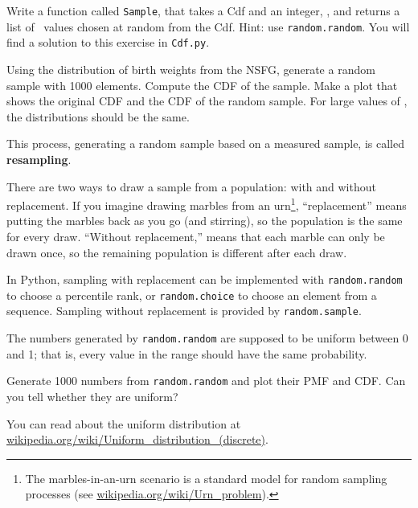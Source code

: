 \documentclass[12pt]{book}
\begin{document}
\begin{exercise}
Write a function called {\tt Sample}, that takes a Cdf and
an integer, \n, and returns a list of \n~values chosen at
random from the Cdf.  Hint: use {\tt random.random}.
You will find a solution to this exercise in {\tt Cdf.py}.

Using the distribution of birth weights from the NSFG, generate a
random sample with 1000 elements.  Compute the CDF of the sample.
Make a plot that shows the original CDF and the CDF of the random
sample.  For large values of \n, the distributions should be
the same.

\end{exercise}

This process, generating a random sample based on a measured sample,
is called {\bf resampling}.

There are two ways to draw a sample from a population: with and
without replacement.  If you imagine drawing marbles from an
urn\footnote{The marbles-in-an-urn scenario is a standard model for
  random sampling processes (see
  \url{wikipedia.org/wiki/Urn_problem}).}, ``replacement'' means
putting the marbles back as you go (and stirring), so the population
is the same for every draw.  ``Without replacement,'' means that each
marble can only be drawn once, so the remaining population is
different after each draw.

In Python, sampling with replacement can be implemented with
{\tt random.random} to choose a percentile rank, or {\tt random.choice}
to choose an element from a sequence.  Sampling without replacement
is provided by {\tt random.sample}.

\begin{exercise}
The numbers generated by {\tt random.random} are supposed to be
uniform between 0 and 1; that is, every value in the range
should have the same probability.

Generate 1000 numbers from {\tt random.random} and plot their
PMF and CDF.  Can you tell whether they are uniform?

You can read about the uniform distribution at
\url{wikipedia.org/wiki/Uniform_distribution_(discrete)}.

\end{exercise}
\end{document}
